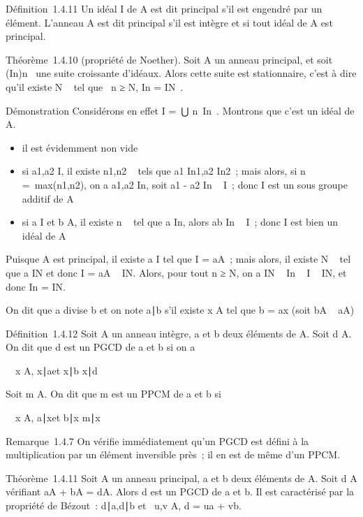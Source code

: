 Définition~1.4.11 Un idéal I de A est dit principal s'il est engendré
par un élément. L'anneau A est dit principal s'il est intègre et si tout
idéal de A est principal.

Théorème~1.4.10 (propriété de Noether). Soit A un anneau principal, et
soit (In)n\in{}~ une suite croissante d'idéaux. Alors
cette suite est stationnaire, c'est à dire qu'il existe N \in {}~ tel que
\forall~n ≥ N, In = IN~.

Démonstration Considérons en effet I =\
⋃  n\in{}~In~. Montrons que
c'est un idéal de A.

\begin{itemize}
\itemsep1pt\parskip0pt
\item
  il est évidemment non vide
\item
  si a1,a2 \in I, il existe n1,n2
  \in {}~ tels que a1 \in In1,a2 \in
  In2~; mais alors, si n =\
  max(n1,n2), on a a1,a2 \in
  In, soit a1 - a2 \in In \subset~ I~;
  donc I est un sous groupe additif de A
\item
  si a \in I et b \in A, il existe n \in {}~ tel que a \in In, alors ab
  \in In \subset~ I~; donc I est bien un idéal de A
\end{itemize}

Puisque A est principal, il existe a \in I tel que I = aA~; mais alors, il
existe N \in {}~ tel que a \in IN et donc I = aA \subset~ IN.
Alors, pour tout n ≥ N, on a IN \subset~ In \subset~ I \subset~
IN, et donc In = IN.

On dit que a divise b et on note a∣b s'il
existe x \in A tel que b = ax (soit bA \subset~ aA)

Définition~1.4.12 Soit A un anneau intègre, a et b deux éléments de A.
Soit d \in A. On dit que d est un PGCD de a et b si on a

\forall~~x \in A,\quad
x∣a\text et
x∣b \mathrel\Leftrightarrow
x∣d

Soit m \in A. On dit que m est un PPCM de a et b si

\forall~~x \in A,\quad
a∣x\text et
b∣x \mathrel\Leftrightarrow
m∣x

Remarque~1.4.7 On vérifie immédiatement qu'un PGCD est défini à la
multiplication par un élément inversible près~; il en est de même d'un
PPCM.

Théorème~1.4.11 Soit A un anneau principal, a et b deux éléments de A.
Soit d \in A vérifiant aA + bA = dA. Alors d est un PGCD de a et b. Il est
caractérisé par la propriété de Bézout~:
d∣a,d\mathrel∣b et
\exists~u,v \in A, d = ua + vb.

